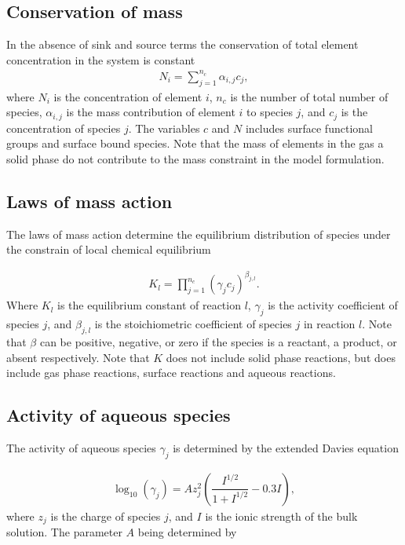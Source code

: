 \documentclass{article}
\begin{document}
\subsection{Conservation of mass}
In the absence of sink and source terms the conservation of total element concentration in the system is constant
\begin{align}
    N_i = \sum_{j=1}^{n_c} \alpha_{i,j} c_j,
\end{align}
where $N_i$ is the concentration of element $i$, $n_c$ is the number of total number of species, $\alpha_{i,j}$ is the mass contribution of element $i$ to species $j$, and  $c_j$ is the concentration of species $j$. The variables $c$ and $N$ includes surface functional groups and surface bound species. Note that the mass of elements in the gas a solid phase do not contribute to the mass constraint in the model formulation.

\subsection{Laws of mass action}
The laws of mass action determine the equilibrium distribution of species under the constrain of local chemical equilibrium

\begin{align}
K_l = \prod_{j=1}^{n_c} \left(\gamma_j c_j\right)^{\beta_{j,l}}.
\end{align}
Where $K_l$ is the equilibrium constant of reaction $l$, $\gamma_j$ is the activity coefficient of species $j$, and $\beta_{j,l}$ is the stoichiometric coefficient of species $j$ in reaction $l$.  Note that $\beta$ can be positive, negative, or zero if the species is a reactant, a product, or absent respectively. Note that $K$ does not include solid phase reactions, but does include gas phase reactions, surface reactions and aqueous reactions. 

\subsection{Activity of aqueous species}
The activity of aqueous species $\gamma_j$ is determined by the extended Davies equation

\begin{align}
    \log_{10}\left(\gamma_j\right) = A z_j^2\left(\dfrac{I^{1/2}}{1+I^{1/2}} - 0.3I\right),
\end{align}
where $z_j$ is the charge of species $j$, and $I$ is the ionic strength of the bulk solution. The parameter $A$ being determined by
\end{document}

